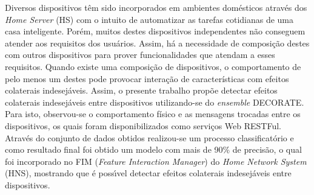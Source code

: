 Diversos dispositivos têm sido incorporados em ambientes domésticos através dos \textit{Home Server} (HS) com o intuito de automatizar as tarefas cotidianas de uma casa inteligente. Porém, muitos destes dispositivos independentes não conseguem atender aos requisitos dos usuários. Assim, há a necessidade de composição destes com outros dispositivos para prover funcionalidades que atendam a esses requisitos. Quando existe uma composição de dispositivos, o comportamento de pelo menos um destes pode provocar interação de características com efeitos colaterais indesejáveis. Assim, o presente trabalho propõe detectar efeitos colaterais indesejáveis entre dispositivos utilizando-se do \textit{ensemble} DECORATE. Para isto, observou-se o comportamento físico e as mensagens trocadas entre os dispositivos, os quais foram disponibilizados como serviços Web RESTFul. Através do conjunto de dados obtidos realizou-se um processo classificatório e como resultado final foi obtido um modelo com mais de 90\% de precisão, o qual foi incorporado no FIM (\textit{Feature Interaction Manager}) do \textit{Home Network System} (HNS), mostrando que é possı́vel detectar efeitos colaterais indesejáveis entre dispositivos.
